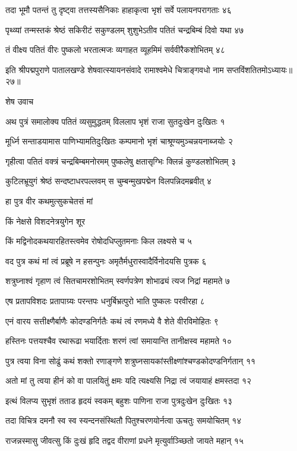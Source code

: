 तदा भूमौ पतन्तं तु दृष्ट्वा तत्तस्यसैनिकाः
हाहाकृत्वा भृशं सर्वे पलायनपरागताः ४६

पृथ्व्यां तन्मस्तकं श्रेष्ठं सकिरीटं सकुण्डलम्
शुशुभेऽतीव पतितं चन्द्रबिम्बं दिवो यथा ४७

तं वीक्ष्य पतितं वीरः पुष्कलो भरतात्मजः
व्यगाहत व्यूहमिमं सर्ववीरैकशोभितम् ४८

इति श्रीपद्मपुराणे पातालखण्डे शेषवात्स्यायनसंवादे रामाश्वमेधे चित्राङ्गवधो नाम सप्तविंशतितमोऽध्यायः॥२७॥


शेष उवाच

अथ पुत्रं समालोक्य पतितं व्यसुमुद्धतम्
विललाप भृशं राजा सुतदुःखेन दुःखितः १

मूर्ध्नि सन्ताडयामास पाणिभ्यामतिदुःखितः
कम्पमानो भृशं चाश्रूण्यमुञ्चन्नयनाब्जयोः २

गृहीत्वा पतितं वक्त्रं चन्द्रबिम्बमनोरमम्
पुष्कलेषु क्षतासृग्भिः क्लिन्नं कुण्डलशोभितम् ३

कुटिलभ्रूयुगं श्रेष्ठं सन्दष्टाधरपल्लवम्
स चुम्बन्मुखपद्मेन विलपन्निदमब्रवीत् ४

हा पुत्र वीर कथमुत्सुकचेतसं मां

किं नेक्षसे विशदनेत्रयुगेन शूर

किं मद्विनोदकथयारहितस्त्वमेव
रोषोदधिप्लुतमनाः किल लक्ष्यसे च ५

वद पुत्र कथं मां त्वं प्रब्रूषे न हसन्पुनः
अमृतैर्मधुरास्वादैर्विनोदयसि पुत्रक ६

शत्रुघ्नाश्वं गृहाण त्वं सितचामरशोभितम्
स्वर्णपत्रेण शोभाढ्यं त्यज निद्रां महामते ७

एष प्रतापविशदः प्रतापाग्र्यः परन्तपः
धनुर्बिभ्रत्पुरो भाति पुष्कलः परवीरहा ८

एनं वारय सत्तीक्ष्णैर्बाणैः कोदण्डनिर्गतैः
कथं त्वं रणमध्ये वै शेते वीरविमोहितः ९

हस्तिनः पत्तयश्चैव रथारूढा भयार्दिताः
शरणं त्वां समायान्ति तानीक्षस्व महामते १०

पुत्र त्वया विना सोढुं कथं शक्तो रणाङ्गणे
शत्रुघ्नसायकांस्तीक्ष्णांश्चण्डकोदण्डनिर्गतान् ११

अतो मां तु त्वया हीनं को वा पालयितुं क्षमः
यदि त्यक्ष्यसि निद्रा त्वं जयायाहं क्षमस्तदा १२

इत्थं विलप्य सुभृशं तताड हृदयं स्वकम्
बहुशः पाणिना राजा पुत्रदुःखेन दुःखितः १३

तदा विचित्र दमनौ स्व स्व स्यन्दनसंस्थितौ
पितुश्चरणयोर्नत्वा ऊचतुः समयोचितम् १४

राजन्नस्मासु जीवत्सु किं दुःखं हृदि तद्वद
वीराणां प्रधने मृत्युर्वाञ्च्छितो जायते महान् १५

